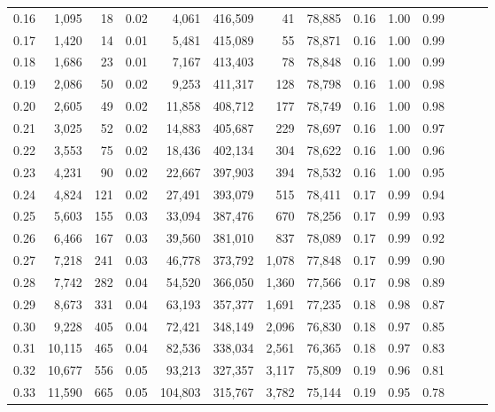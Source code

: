 \begin{tabular}{rrrrrrrrrrrrrr}
0.16 &   1,095 &     18 &  0.02 &    4,061 &  416,509 &      41 &  78,885 &  0.16 &  1.00 &      0.99 \\
0.17 &   1,420 &     14 &  0.01 &    5,481 &  415,089 &      55 &  78,871 &  0.16 &  1.00 &      0.99 \\
0.18 &   1,686 &     23 &  0.01 &    7,167 &  413,403 &      78 &  78,848 &  0.16 &  1.00 &      0.99 \\
0.19 &   2,086 &     50 &  0.02 &    9,253 &  411,317 &     128 &  78,798 &  0.16 &  1.00 &      0.98 \\
0.20 &   2,605 &     49 &  0.02 &   11,858 &  408,712 &     177 &  78,749 &  0.16 &  1.00 &      0.98 \\
0.21 &   3,025 &     52 &  0.02 &   14,883 &  405,687 &     229 &  78,697 &  0.16 &  1.00 &      0.97 \\
0.22 &   3,553 &     75 &  0.02 &   18,436 &  402,134 &     304 &  78,622 &  0.16 &  1.00 &      0.96 \\
0.23 &   4,231 &     90 &  0.02 &   22,667 &  397,903 &     394 &  78,532 &  0.16 &  1.00 &      0.95 \\
0.24 &   4,824 &    121 &  0.02 &   27,491 &  393,079 &     515 &  78,411 &  0.17 &  0.99 &      0.94 \\
0.25 &   5,603 &    155 &  0.03 &   33,094 &  387,476 &     670 &  78,256 &  0.17 &  0.99 &      0.93 \\
0.26 &   6,466 &    167 &  0.03 &   39,560 &  381,010 &     837 &  78,089 &  0.17 &  0.99 &      0.92 \\
0.27 &   7,218 &    241 &  0.03 &   46,778 &  373,792 &   1,078 &  77,848 &  0.17 &  0.99 &      0.90 \\
0.28 &   7,742 &    282 &  0.04 &   54,520 &  366,050 &   1,360 &  77,566 &  0.17 &  0.98 &      0.89 \\
0.29 &   8,673 &    331 &  0.04 &   63,193 &  357,377 &   1,691 &  77,235 &  0.18 &  0.98 &      0.87 \\
0.30 &   9,228 &    405 &  0.04 &   72,421 &  348,149 &   2,096 &  76,830 &  0.18 &  0.97 &      0.85 \\
0.31 &  10,115 &    465 &  0.04 &   82,536 &  338,034 &   2,561 &  76,365 &  0.18 &  0.97 &      0.83 \\
0.32 &  10,677 &    556 &  0.05 &   93,213 &  327,357 &   3,117 &  75,809 &  0.19 &  0.96 &      0.81 \\
0.33 &  11,590 &    665 &  0.05 &  104,803 &  315,767 &   3,782 &  75,144 &  0.19 &  0.95 &      0.78 \\

\end{tabular}
